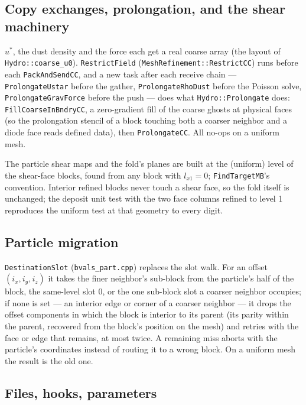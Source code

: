 \documentclass[11pt]{article}
\newcommand{\code}[1]{\texttt{#1}}
\newcommand{\file}[1]{\texttt{\small #1}}
\newcommand{\fn}[1]{\texttt{\small #1}}
\begin{document}
\subsection{Copy exchanges, prolongation, and the shear machinery}

$u^*$, the dust density and the force each get a real coarse array (the layout of
\code{Hydro::coarse\_u0}). \fn{RestrictField} (\fn{MeshRefinement::RestrictCC}) runs before
each \fn{PackAndSendCC}, and a new task after each receive chain --- \fn{ProlongateUstar}
before the gather, \fn{ProlongateRhoDust} before the Poisson solve, \fn{ProlongateGravForce}
before the push --- does what \fn{Hydro::Prolongate} does: \fn{FillCoarseInBndryCC}, a
zero-gradient fill of the coarse ghosts at physical faces (so the prolongation stencil of a
block touching both a coarser neighbor and a diode face reads defined data), then
\fn{ProlongateCC}. All no-ops on a uniform mesh.

The particle shear maps and the fold's planes are built at the (uniform) level of the
shear-face blocks, found from any block with $l_{x1} = 0$; \fn{FindTargetMB}'s convention.
Interior refined blocks never touch a shear face, so the fold itself is unchanged; the
deposit unit test with the two face columns refined to level 1 reproduces the uniform
test at that geometry to every digit.

\subsection{Particle migration}

\fn{DestinationSlot} (\file{bvals\_part.cpp}) replaces the slot walk. For an offset
$(i_x,i_y,i_z)$ it takes the finer neighbor's sub-block from the particle's half of the
block, the same-level slot $0$, or the one sub-block slot a coarser neighbor occupies; if
none is set --- an interior edge or corner of a coarser neighbor --- it drops the offset
components in which the block is interior to its parent (its parity within the parent,
recovered from the block's position on the mesh) and retries with the face or edge that
remains, at most twice. A remaining miss aborts with the particle's coordinates instead of
routing it to a wrong block. On a uniform mesh the result is the old one.

\subsection{Files, hooks, parameters}
\end{document}
